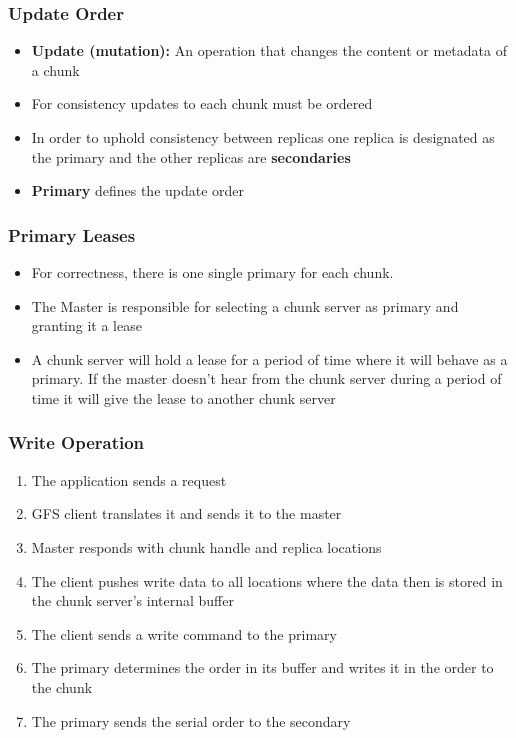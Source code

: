 \documentclass[12pt]{article}
\begin{document}
\subsubsection{Update Order}
\begin{itemize}
    \item \textbf{Update (mutation):} An operation that changes the content or metadata of a chunk
    \item For consistency updates to each chunk must be ordered
    \item In order to uphold consistency between replicas one replica is designated as the primary and the other replicas are \textbf{secondaries}
    \item \textbf{Primary} defines the update order
\end{itemize}

\subsubsection{Primary Leases}
\begin{itemize}
    \item For correctness, there is one single primary for each chunk.
    \item The Master is responsible for selecting a chunk server as primary and granting it a lease
    \item A chunk server will hold a lease for a period of time where it will behave as a primary. If the master doesn't hear from the chunk server during a period of time it will give the lease to another chunk server
\end{itemize}

\subsubsection{Write Operation}
\begin{enumerate}
    \item The application sends a request
    \item GFS client translates it and sends it to the master
    \item Master responds with chunk handle and replica locations
    \item The client pushes write data to all locations where the data then is stored in the chunk server's internal buffer
    \item The client sends a write command to the primary
    \item The primary determines the order in its buffer and writes it in the order to the chunk
    \item The primary sends the serial order to the secondary
\end{enumerate}
\end{document}
